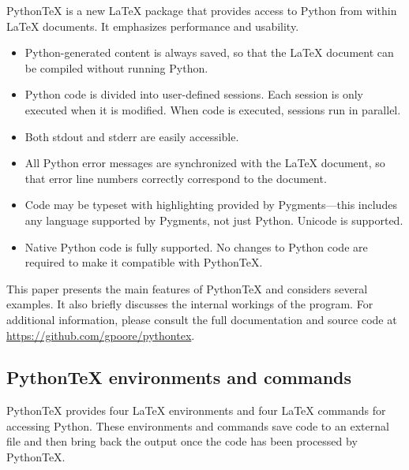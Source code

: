 \documentclass[letterpaper,compsoc,twoside]{IEEEtran}
\begin{document}
PythonTeX is a new LaTeX package that provides access to Python from
within LaTeX documents. It emphasizes performance and usability.%
\begin{itemize}

\item 

Python-generated content is always saved, so that the LaTeX document
can be compiled without running Python.
\item 

Python code is divided into user-defined sessions. Each session is
only executed when it is modified. When code is executed, sessions run
in parallel.
\item 

Both stdout and stderr are easily accessible.
\item 

All Python error messages are synchronized with the LaTeX document, so
that error line numbers correctly correspond to the document.
\item 

Code may be typeset with highlighting provided by Pygments—this
includes any language supported by Pygments, not just Python.
Unicode is supported.
\item 

Native Python code is fully supported. No changes to Python code are
required to make it compatible with PythonTeX.
\end{itemize}


This paper presents the main features of PythonTeX and considers
several examples.  It also briefly discusses the internal workings of
the program. For additional information, please consult the full
documentation and source code at \url{https://github.com/gpoore/pythontex}.

\subsection{PythonTeX environments and commands%
  \label{pythontex-environments-and-commands}%
}


PythonTeX provides four LaTeX environments and four LaTeX commands for
accessing Python. These environments and commands save code to an
external file and then bring back the output once the code has been
processed by PythonTeX.
\end{document}
